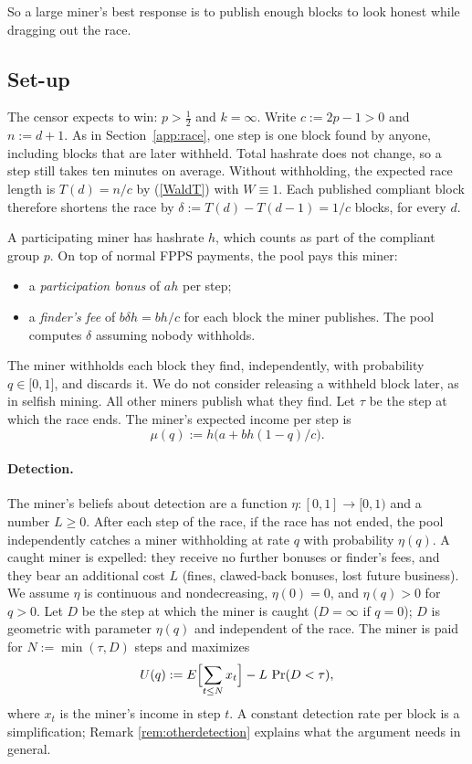 \documentclass{article}%
\begin{document}
\noindent So a large miner's best response is to publish enough blocks to look
honest while dragging out the race.

\subsection{Set-up}

The censor expects to win: $p>\frac{1}{2}$ and $k=\infty$. Write $c:=2p-1>0$
and $n:=d+1$. As in Section~\ref{app:race}, one step is one block found by
anyone, including blocks that are later withheld. Total hashrate does not
change, so a step still takes ten minutes on average. Without withholding, the
expected race length is $T(d)=n/c$ by (\ref{WaldT}) with $W\equiv1$. Each
published compliant block therefore shortens the race by
$\delta:=T(d)-T(d-1)=1/c$ blocks, for every $d$.

A participating miner has hashrate $h$, which counts as part of the compliant
group $p$. On top of normal FPPS payments, the pool pays this miner:

\begin{itemize}
\item a \emph{participation bonus} of $ah$ per step;

\item a \emph{finder's fee} of $b\delta h=bh/c$ for each block the miner
publishes. The pool computes $\delta$ assuming nobody withholds.
\end{itemize}

\noindent The miner withholds each block they find, independently, with
probability $q\in\lbrack0,1]$, and discards it. We do not consider releasing a
withheld block later, as in selfish mining. All other miners publish what they
find. Let $\tau$ be the step at which the race ends. The miner's expected
income per step is
\[
\mu(q):=h\bigl(a+bh(1-q)/c\bigr).
\]

\paragraph{Detection.} The miner's beliefs about detection are a function
$\eta:[0,1]\rightarrow\lbrack0,1)$ and a number $L\geq0$. After each step of
the race, if the race has not ended, the pool independently catches a miner
withholding at rate $q$ with probability $\eta(q)$. A caught miner is expelled:
they receive no further bonuses or finder's fees, and they bear an additional
cost $L$ (fines, clawed-back bonuses, lost future business). We assume $\eta$
is continuous and nondecreasing, $\eta(0)=0$, and $\eta(q)>0$ for $q>0$. Let
$D$ be the step at which the miner is caught ($D=\infty$ if $q=0$); $D$ is
geometric with parameter $\eta(q)$ and independent of the race. The miner is
paid for $N:=\min(\tau,D)$ steps and maximizes
\[
U(q):=E\Bigl[\sum_{t\leq N}x_{t}\Bigr]-L\,\Pr(D<\tau),
\]
where $x_{t}$ is the miner's income in step $t$. A constant detection rate per
block is a simplification; Remark \ref{rem:otherdetection} explains what the
argument needs in general.
\end{document}
